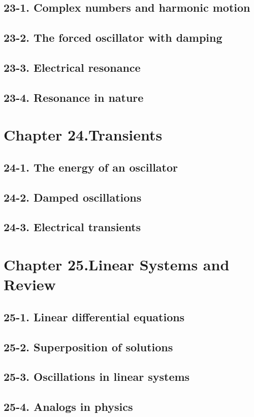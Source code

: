 \documentclass{article}
\begin{document}
\subsection{23-1. Complex numbers and harmonic motion}
\subsection{23-2. The forced oscillator with damping}
\subsection{23-3. Electrical resonance}
\subsection{23-4. Resonance in nature}
\section{Chapter 24.Transients}
\subsection{24-1. The energy of an oscillator}
\subsection{24-2. Damped oscillations}
\subsection{24-3. Electrical transients}
\section{Chapter 25.Linear Systems and Review}
\subsection{25-1. Linear differential equations}
\subsection{25-2. Superposition of solutions}
\subsection{25-3. Oscillations in linear systems}
\subsection{25-4. Analogs in physics}
\end{document}
